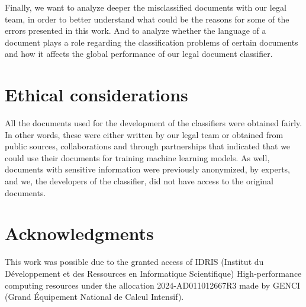 \documentclass[11pt]{article}
\newcommand{\filluptopage}[1]{%
  \clearpage
  \loop\ifnum\value{page}<#1\relax
    \null\clearpage
  \repeat
}
\begin{document}
    Finally, we want to analyze deeper the misclassified documents with our legal team, in order to better understand what could be the reasons for some of the errors presented in this work. And to analyze whether the language of a document plays a role regarding the classification problems of certain documents and how it affects the global performance of our legal document classifier.


\section*{Ethical considerations}

    All the documents used for the development of the classifiers were obtained fairly. In other words, these were either written by our legal team or obtained from public sources, collaborations and through partnerships that indicated that we could use their documents for training machine learning models. As well, documents with sensitive information were previously anonymized, by experts, and we, the developers of the classifier, did not have access to the original documents. 

\section*{Acknowledgments}
    This work was possible due to the granted access of IDRIS (Institut du Développement et des Ressources en Informatique Scientifique) High-performance computing resources under the allocation 2024-AD011012667R3 made by GENCI (Grand Équipement National de Calcul Intensif).

%

\end{document}
